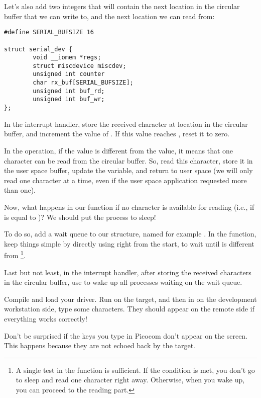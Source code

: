 Let's also add two integers that will contain the next location
in the circular buffer that we can write to, and the next location
we can read from:

\begin{verbatim}
#define SERIAL_BUFSIZE 16

struct serial_dev {
        void __iomem *regs;
        struct miscdevice miscdev;
        unsigned int counter
        char rx_buf[SERIAL_BUFSIZE];
        unsigned int buf_rd;
        unsigned int buf_wr;
};
\end{verbatim}

In the interrupt handler, store the received character at location
 in the circular buffer, and increment the value
of . If this value reaches ,
reset it to zero.

In the  operation, if the  value is
different from the  value, it means that one
character can be read from the circular buffer. So, read this
character, store it in the user space buffer, update the
 variable, and return to user space (we will only
read one character at a time, even if the user space application
requested more than one).

Now, what happens in our  function if no character is
available for reading (i.e., if  is equal to
)? We should put the process to sleep!

To do so, add a  wait queue to our
 structure, named for example . In the
 function, keep things simple by directly using
 right from the start, to wait until
 is different from \footnote{A single test in the
 function is sufficient. If the
condition is met, you don't go to sleep and read one character right away.
Otherwise, when you wake up, you can proceed to the reading part.}.

Last but not least, in the interrupt handler,
after storing the received characters in the circular buffer, use
 to wake up all processes waiting on the wait queue.

Compile and load your driver. Run 
on the target, and then in  on the development
workstation side, type some characters. They should appear on the
remote side if everything works correctly!

Don't be surprised if the keys you type in Picocom don't appear on the
screen. This happens because they are not echoed back by the target.

